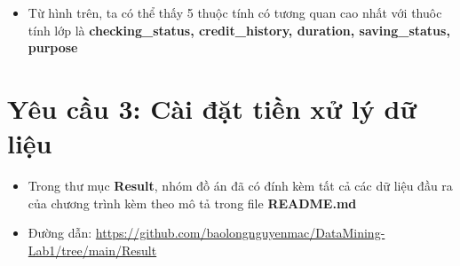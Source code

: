\documentclass[a4paper, 12pt]{article}
\begin{document}
\begin{itemize}
    \item Từ hình trên, ta có thể thấy 5 thuộc tính có tương quan cao nhất với thuôc tính lớp là \textbf{checking\_status, credit\_history, duration, saving\_status, purpose}
\end{itemize}

\clearpage

\section{Yêu cầu 3: Cài đặt tiền xử lý dữ liệu}
\begin{itemize}
    \item Trong thư mục \textbf{Result}, nhóm đồ án đã có đính kèm tất cả các dữ liệu đầu ra của chương trình kèm theo mô tả trong file \textbf{README.md}
    \item Đường dẫn: \url{https://github.com/baolongnguyenmac/DataMining-Lab1/tree/main/Result}
\end{itemize}
\end{document}
